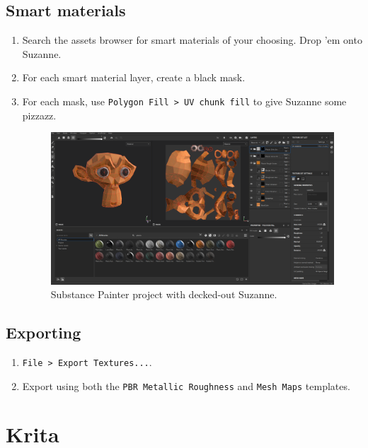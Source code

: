 \documentclass[12pt, letterpaper]{article}
\begin{document}
\subsection{Smart materials}
\begin{enumerate}
    \item Search the assets browser for smart materials of your choosing. Drop 'em onto Suzanne.
    \item For each smart material layer, create a black mask.
    \item For each mask, use \verb|Polygon Fill > UV chunk fill| to give Suzanne some pizzazz.
          \begin{figure}[H]
              \includegraphics[scale=0.4]{assets/img/substance-project.png}
              \caption{Substance Painter project with decked-out Suzanne.}
          \end{figure}
\end{enumerate}

\subsection{Exporting}
\begin{enumerate}
    \item \verb|File > Export Textures...|.
    \item Export using both the \verb|PBR Metallic Roughness| and \verb|Mesh Maps| templates.
\end{enumerate}

\section{Krita}
\end{document}
